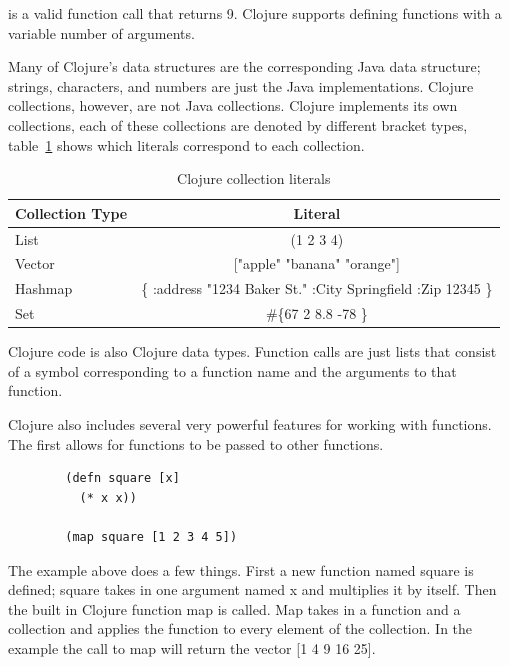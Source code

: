 \documentclass[12pt]{article}
\begin{document}
	is a valid function call that returns 9. Clojure supports defining functions with a variable number of arguments. 
	
	Many of Clojure's data structures are the corresponding Java data structure; strings, characters, and numbers are just the Java implementations\cite{cloj:structs}. Clojure collections, however, are not Java collections. Clojure implements its own collections, each of these collections are denoted by different bracket types, table~\ref{coll:table} shows which literals correspond to each collection.
	
	\begin{table}[b]
	\caption{Clojure collection literals\label{coll:table}}	
	\begin{tabular}{ | l | c | }
	\hline
	Collection Type & Literal \\ \hline
	List & (1 2 3 4) \\ \hline
	Vector & ["apple" "banana" "orange"] \\ \hline
	Hashmap & \{ :address "1234 Baker St." :City Springfield :Zip 12345 \} \\ \hline
	Set & \#\{67 2 8.8 -78 \} \\
	\hline
	\end{tabular}
	\end{table}	
	Clojure code is also Clojure data types. Function calls are just lists that consist of a symbol corresponding to a function name and the arguments to that function.
	
	Clojure also includes several very powerful features for working with functions. The first allows for functions to be passed to other functions. 
	\begin{verbatim}
		(defn square [x] 
		  (* x x))
		
		(map square [1 2 3 4 5])
	\end{verbatim}
	The example above does a few things. First a new function named square is defined; square takes in one argument named x and multiplies it by itself. Then the built in Clojure function map is called. Map takes in a function and a collection and applies the function to every element of the collection. In the example the call to map will return the vector [1 4 9 16 25]. 
	
\end{document}
